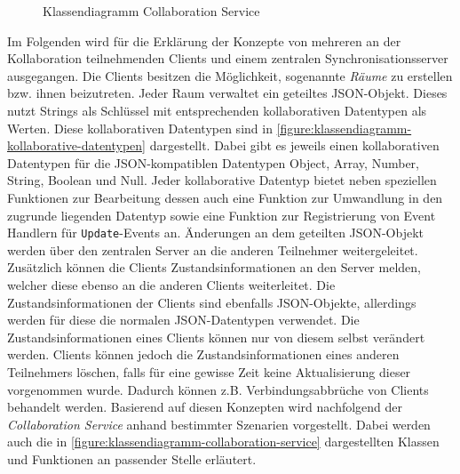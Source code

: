 \begin{figure}[tbp]
    \caption{Klassendiagramm Collaboration Service}
    \label{figure:klassendiagramm-collaboration-service}
\end{figure}

Im Folgenden wird für die Erklärung der Konzepte von mehreren an der Kollaboration teilnehmenden Clients und einem zentralen Synchronisationsserver ausgegangen. Die Clients besitzen die Möglichkeit, sogenannte \textit{Räume} zu erstellen bzw. ihnen beizutreten. Jeder Raum verwaltet ein geteiltes JSON-Objekt. Dieses nutzt Strings als Schlüssel mit entsprechenden kollaborativen Datentypen als Werten. Diese kollaborativen Datentypen sind in \autoref{figure:klassendiagramm-kollaborative-datentypen} dargestellt. Dabei gibt es jeweils einen kollaborativen Datentypen für die JSON-kompatiblen Datentypen Object, Array, Number, String, Boolean und Null. Jeder kollaborative Datentyp bietet neben speziellen Funktionen zur Bearbeitung dessen auch eine Funktion zur Umwandlung in den zugrunde liegenden Datentyp sowie eine Funktion zur Registrierung von Event Handlern für \texttt{Update}-Events an. Änderungen an dem geteilten JSON-Objekt werden über den zentralen Server an die anderen Teilnehmer weitergeleitet. Zusätzlich können die Clients Zustandsinformationen an den Server melden, welcher diese ebenso an die anderen Clients weiterleitet. Die Zustandsinformationen der Clients sind ebenfalls JSON-Objekte, allerdings werden für diese die normalen JSON-Datentypen verwendet. Die Zustandsinformationen eines Clients können nur von diesem selbst verändert werden. Clients können jedoch die Zustandsinformationen eines anderen Teilnehmers löschen, falls für eine gewisse Zeit keine Aktualisierung dieser vorgenommen wurde. Dadurch können z.B. Verbindungsabbrüche von Clients behandelt werden. Basierend auf diesen Konzepten wird nachfolgend der \textit{Collaboration Service} anhand bestimmter Szenarien vorgestellt. Dabei werden auch die in \autoref{figure:klassendiagramm-collaboration-service} dargestellten Klassen und Funktionen an passender Stelle erläutert.

